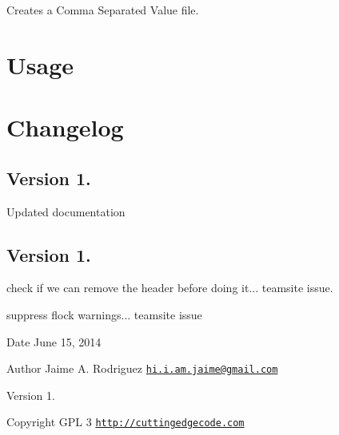Creates a Comma Separated Value file.\hypertarget{nav1_usage}{}\section{Usage}\label{nav1_usage}

\hypertarget{nav1_changelog}{}\section{Changelog}\label{nav1_changelog}
\subsection*{Version 1.}


\begin{DoxyItemize}
\item Updated documentation
\end{DoxyItemize}

\subsection*{Version 1.}


\begin{DoxyItemize}
\item check if we can remove the header before doing it... teamsite issue.
\item suppress flock warnings... teamsite issue
\end{DoxyItemize}

\begin{DoxyDate}{Date}
June 15, 2014 
\end{DoxyDate}
\begin{DoxyAuthor}{Author}
Jaime A. Rodriguez \href{mailto:hi.i.am.jaime@gmail.com}{\tt hi.\-i.\-am.\-jaime@gmail.\-com} 
\end{DoxyAuthor}
\begin{DoxyVersion}{Version}
1. 
\end{DoxyVersion}
\begin{DoxyCopyright}{Copyright}
G\-P\-L 3 \href{http://cuttingedgecode.com}{\tt http\-://cuttingedgecode.\-com} 
\end{DoxyCopyright}
